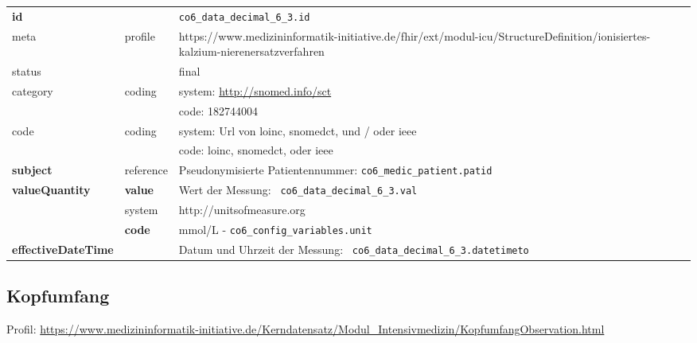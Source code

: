 \begin{longtable}{|l|l|p{7.5cm}|}
        \hline
        \rowcolor{lightgray} \multicolumn{3}{|l|}{Data Mapping (inhaltlich)} \\ \hline
        \textbf{id} &  & \texttt{co6\_data\_decimal\_6\_3.id} \\ \hline
	meta & profile & https://www.medizininformatik-initiative.de/fhir/ext/modul-icu/StructureDefinition/ionisiertes-kalzium-nierenersatzverfahren \\ \hline 
	status &  & final   \\ \hline 
	category & coding & system: \url{http://snomed.info/sct} \\
\cline{3-3}
	& & code: 182744004 \\ \hline
	code & coding & system: Url von \ac{loinc}, \ac{snomedct}, und / oder \ac{ieee} \\ 
	\cline{3-3} 
	 &  & code: \ac{loinc}, \ac{snomedct}, oder \ac{ieee} \\ \hline
	 \textbf{subject}  & reference & Pseudonymisierte Patientennummer: \texttt{co6\_medic\_patient.patid} \\ \hline
	 \textbf{valueQuantity}  & \textbf{value} & Wert der Messung: \texttt{
co6\_data\_decimal\_6\_3.val} \\
        \cline{2-3}
         & system & http://unitsofmeasure.org \\
         \cline{2-3}
         & \textbf{code} & mmol/L - \texttt{co6\_config\_variables.unit} \\ \hline
     \textbf{effectiveDateTime}  & & Datum und Uhrzeit der Messung: \texttt{
co6\_data\_decimal\_6\_3.datetimeto} \\ \hline
\end{longtable}

\subsection{Kopfumfang} 

Profil: \url{https://www.medizininformatik-initiative.de/Kerndatensatz/Modul_Intensivmedizin/KopfumfangObservation.html}

